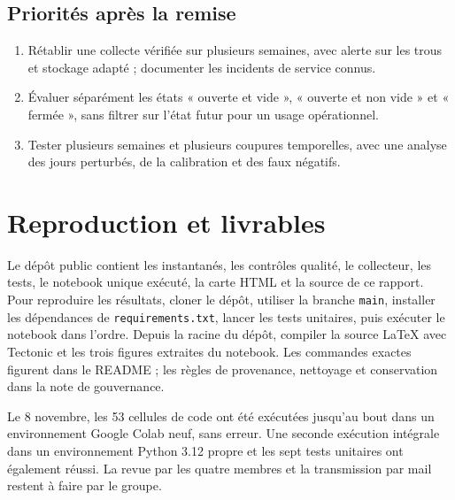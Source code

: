 \documentclass[11pt,a4paper]{article}
\begin{document}
\subsection{Priorités après la remise}
\begin{enumerate}[leftmargin=1.6em,itemsep=0.2em]
\item Rétablir une collecte vérifiée sur plusieurs semaines, avec alerte sur les trous et stockage adapté ; documenter les incidents de service connus.
\item Évaluer séparément les états « ouverte et vide », « ouverte et non vide » et « fermée », sans filtrer sur l'état futur pour un usage opérationnel.
\item Tester plusieurs semaines et plusieurs coupures temporelles, avec une analyse des jours perturbés, de la calibration et des faux négatifs.
\end{enumerate}

\section{Reproduction et livrables}

Le dépôt public contient les instantanés, les contrôles qualité, le collecteur, les tests, le notebook unique exécuté, la carte HTML et la source de ce rapport. Pour reproduire les résultats, cloner le dépôt, utiliser la branche \texttt{main}, installer les dépendances de \texttt{requirements.txt}, lancer les tests unitaires, puis exécuter le notebook dans l'ordre. Depuis la racine du dépôt, compiler la source LaTeX avec Tectonic et les trois figures extraites du notebook. Les commandes exactes figurent dans le README ; les règles de provenance, nettoyage et conservation dans la note de gouvernance.

Le 8 novembre, les 53 cellules de code ont été exécutées jusqu'au bout dans un environnement Google Colab neuf, sans erreur. Une seconde exécution intégrale dans un environnement Python 3.12 propre et les sept tests unitaires ont également réussi. La revue par les quatre membres et la transmission par mail restent à faire par le groupe.
\end{document}
